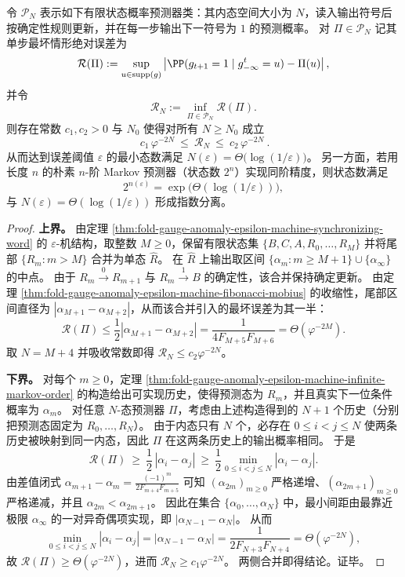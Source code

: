 \begin{theorem}[有限状态近似的最坏情形误差尺度律]\label{thm:fold-gauge-anomaly-finite-state-minimax-abs-error}
令 \(\mathscr P_N\) 表示如下有限状态概率预测器类：其内态空间大小为 \(N\)，读入输出符号后按确定性规则更新，并在每一步输出下一符号为 \(1\) 的预测概率。
对 \(\Pi\in\mathscr P_N\) 记其单步最坏情形绝对误差为
\[
\mathcal R(\Pi):=\sup_{u\in\operatorname{supp}(g)}\left|\PP(g_{t+1}=1\mid g_{-\infty}^t=u)-\Pi(u)\right|,
\]
并令
\[
\mathcal R_N:=\inf_{\Pi\in\mathscr P_N}\mathcal R(\Pi).
\]
则存在常数 \(c_1,c_2>0\) 与 \(N_0\) 使得对所有 \(N\ge N_0\) 成立
\[
\boxed{\ c_1\,\varphi^{-2N}\ \le\ \mathcal R_N\ \le\ c_2\,\varphi^{-2N}\ }.
\]
从而达到误差阈值 \(\varepsilon\) 的最小态数满足 \(N(\varepsilon)=\Theta\!\bigl(\log(1/\varepsilon)\bigr)\)。
另一方面，若用长度 \(n\) 的朴素 \(n\)-阶 Markov 预测器（状态数 \(2^n\)）实现同阶精度，则状态数满足
\[
2^{n(\varepsilon)}=\exp\!\bigl(\Theta(\log(1/\varepsilon))\bigr),
\]
与 \(N(\varepsilon)=\Theta(\log(1/\varepsilon))\) 形成指数分离。
\end{theorem}
\begin{proof}
\textbf{上界。}
由定理 \ref{thm:fold-gauge-anomaly-epsilon-machine-synchronizing-word} 的 \(\varepsilon\)-机结构，取整数 \(M\ge 0\)，保留有限状态集 \(\{B,C,A,R_0,\dots,R_M\}\) 并将尾部 \(\{R_{m}:m>M\}\) 合并为单态 \(\widehat R\)。
在 \(\widehat R\) 上输出取区间 \(\{\alpha_m:m\ge M+1\}\cup\{\alpha_\infty\}\) 的中点。
由于 \(R_m\xrightarrow{0}R_{m+1}\) 与 \(R_m\xrightarrow{1}B\) 的确定性，该合并保持确定更新。
由定理 \ref{thm:fold-gauge-anomaly-epsilon-machine-fibonacci-mobius} 的收缩性，尾部区间直径为 \(|\alpha_{M+1}-\alpha_{M+2}|\)，从而该合并引入的最坏误差为其一半：
\[
\mathcal R(\Pi)\le \frac12|\alpha_{M+1}-\alpha_{M+2}|=\frac{1}{4F_{M+5}F_{M+6}}=\Theta(\varphi^{-2M}).
\]
取 \(N=M+4\) 并吸收常数即得 \(\mathcal R_N\le c_2\varphi^{-2N}\)。
\par
\textbf{下界。}
对每个 \(m\ge 0\)，定理 \ref{thm:fold-gauge-anomaly-epsilon-machine-infinite-markov-order} 的构造给出可实现历史，使得预测态为 \(R_m\)，并且真实下一位条件概率为 \(\alpha_m\)。
对任意 \(N\)-态预测器 \(\Pi\)，考虑由上述构造得到的 \(N+1\) 个历史（分别把预测态固定为 \(R_0,\dots,R_N\)）。
由于内态只有 \(N\) 个，必存在 \(0\le i<j\le N\) 使两条历史被映射到同一内态，因此 \(\Pi\) 在这两条历史上的输出概率相同。
于是
\[
\mathcal R(\Pi)\ \ge\ \frac12\,|\alpha_i-\alpha_j|\ \ge\ \frac12\min_{0\le i<j\le N}|\alpha_i-\alpha_j|.
\]
由差值闭式
\(
\alpha_{m+1}-\alpha_{m}=\frac{(-1)^{m}}{2F_{m+4}F_{m+5}}
\)
可知 \((\alpha_{2m})_{m\ge 0}\) 严格递增、\((\alpha_{2m+1})_{m\ge 0}\) 严格递减，并且 \(\alpha_{2m}<\alpha_{2m+1}\)。
因此在集合 \(\{\alpha_0,\dots,\alpha_N\}\) 中，最小间距由最靠近极限 \(\alpha_\infty\) 的一对异奇偶项实现，即 \(|\alpha_{N-1}-\alpha_N|\)。
从而
\[
\min_{0\le i<j\le N}|\alpha_i-\alpha_j|=|\alpha_{N-1}-\alpha_N|
=\frac{1}{2F_{N+3}F_{N+4}}=\Theta(\varphi^{-2N}),
\]
故 \(\mathcal R(\Pi)\ge \Theta(\varphi^{-2N})\)，进而 \(\mathcal R_N\ge c_1\varphi^{-2N}\)。
两侧合并即得结论。证毕。
\end{proof}

\endinput
